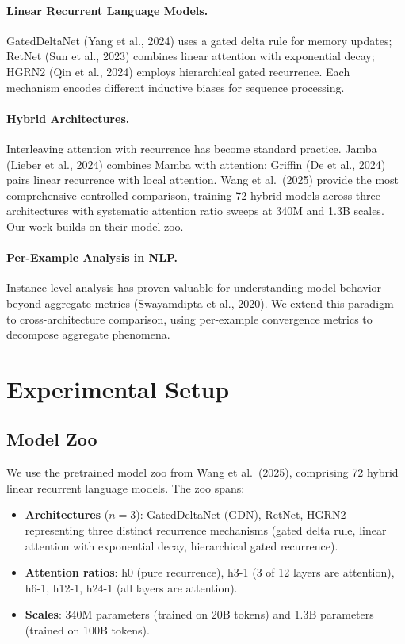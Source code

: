 \documentclass[11pt,a4paper]{article}
\begin{document}
\paragraph{Linear Recurrent Language Models.}
GatedDeltaNet (Yang et al., 2024) uses a gated delta rule for memory updates; RetNet (Sun et al., 2023) combines linear attention with exponential decay; HGRN2 (Qin et al., 2024) employs hierarchical gated recurrence. Each mechanism encodes different inductive biases for sequence processing.

\paragraph{Hybrid Architectures.}
Interleaving attention with recurrence has become standard practice. Jamba (Lieber et al., 2024) combines Mamba with attention; Griffin (De et al., 2024) pairs linear recurrence with local attention. Wang et al.\ (2025) provide the most comprehensive controlled comparison, training 72 hybrid models across three architectures with systematic attention ratio sweeps at 340M and 1.3B scales. Our work builds on their model zoo.

\paragraph{Per-Example Analysis in NLP.}
Instance-level analysis has proven valuable for understanding model behavior beyond aggregate metrics (Swayamdipta et al., 2020). We extend this paradigm to cross-architecture comparison, using per-example convergence metrics to decompose aggregate phenomena.

\section{Experimental Setup}

\subsection{Model Zoo}

We use the pretrained model zoo from Wang et al.\ (2025), comprising 72 hybrid linear recurrent language models. The zoo spans:
\begin{itemize}
    \item \textbf{Architectures} ($n{=}3$): GatedDeltaNet (GDN), RetNet, HGRN2---representing three distinct recurrence mechanisms (gated delta rule, linear attention with exponential decay, hierarchical gated recurrence).
    \item \textbf{Attention ratios}: h0 (pure recurrence), h3-1 (3 of 12 layers are attention), h6-1, h12-1, h24-1 (all layers are attention).
    \item \textbf{Scales}: 340M parameters (trained on 20B tokens) and 1.3B parameters (trained on 100B tokens).
\end{itemize}
\end{document}
